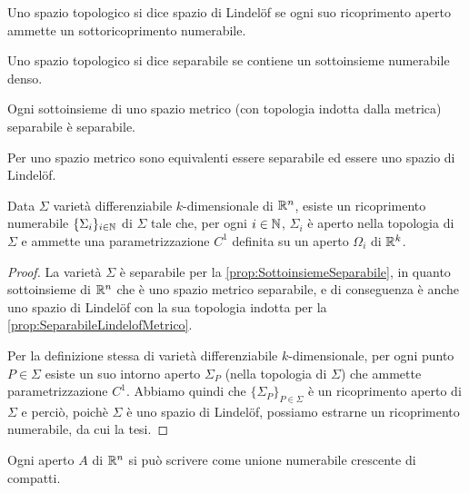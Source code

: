 \begin{definition}
	Uno spazio topologico si dice spazio di Lindelöf se ogni suo ricoprimento aperto ammette un sottoricoprimento numerabile. 
\end{definition}

\begin{definition}
	Uno spazio topologico si dice separabile se contiene un sottoinsieme numerabile denso.
\end{definition}

\begin{proposition}\label{prop:SottoinsiemeSeparabile}
	Ogni sottoinsieme di uno spazio metrico (con topologia indotta dalla metrica) separabile è separabile.
\end{proposition}

\begin{proposition}\label{prop:SeparabileLindelofMetrico}
	Per uno spazio metrico sono equivalenti essere separabile ed essere uno spazio di Lindelöf.
\end{proposition}

\begin{proposition}\label{prop:SottovarietaUnioneNumerabile}
	Data $\Sigma$ varietà differenziabile $k$-dimensionale di $\mathbb R^n$, esiste un ricoprimento numerabile  $\{\Sigma_i\}_{i\in\mathbb N}$ di $\Sigma$ tale che, per ogni $i\in\mathbb N$, $\Sigma_i$ è aperto nella topologia di $\Sigma$ e ammette una parametrizzazione $C^1$ definita su un aperto $\Omega_i$ di $\mathbb R^k$.
\end{proposition}
\begin{proof}
	La varietà $\Sigma$ è separabile per la \cref{prop:SottoinsiemeSeparabile}, in quanto sottoinsieme di $\mathbb R^n$ che è uno spazio metrico separabile, e di conseguenza è anche uno spazio di Lindelöf con la sua topologia indotta per la \cref{prop:SeparabileLindelofMetrico}.
	
	Per la definizione stessa di varietà differenziabile $k$-dimensionale, per ogni punto $P\in\Sigma$ esiste un suo intorno aperto $\Sigma_P$ (nella topologia di $\Sigma$) che ammette parametrizzazione $C^1$. Abbiamo quindi che $\{\Sigma_P\}_{P\in\Sigma}$ è un ricoprimento aperto di $\Sigma$ e perciò, poichè $\Sigma$ è uno spazio di Lindelöf, possiamo estrarne un ricoprimento numerabile, da cui la tesi.
\end{proof}

\begin{proposition}\label{prop:ApertoUnioneCompatti}
	Ogni aperto $A$ di $\mathbb R^n$ si può scrivere come unione numerabile crescente di compatti.
\end{proposition}

